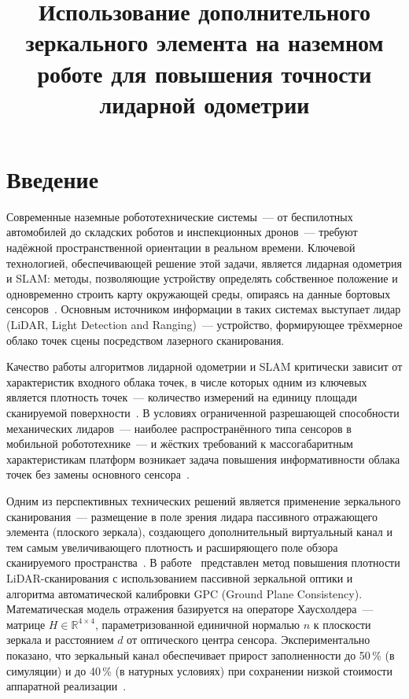 \documentclass{misisarticle}
\title{Использование дополнительного зеркального элемента на наземном роботе для повышения точности лидарной одометрии}
\begin{document}
\maketitle

\section{Введение}

Современные наземные робототехнические системы~--- от беспилотных автомобилей до складских роботов и инспекционных дронов~--- требуют надёжной пространственной ориентации в реальном времени. Ключевой технологией, обеспечивающей решение этой задачи, является лидарная одометрия и SLAM: методы, позволяющие устройству определять собственное положение и одновременно строить карту окружающей среды, опираясь на данные бортовых сенсоров~\cite{thrun2005,xu2021}. Основным источником информации в таких системах выступает лидар (LiDAR, Light Detection and Ranging)~--- устройство, формирующее трёхмерное облако точек сцены посредством лазерного сканирования.

Качество работы алгоритмов лидарной одометрии и SLAM критически зависит от характеристик входного облака точек, в числе которых одним из ключевых является плотность точек~--- количество измерений на единицу площади сканируемой поверхности~\cite{beraldin2010}. В условиях ограниченной разрешающей способности механических лидаров~--- наиболее распространённого типа сенсоров в мобильной робототехнике~--- и жёстких требований к массогабаритным характеристикам платформ возникает задача повышения информативности облака точек без замены основного сенсора~\cite{wang2020,yoo2018}.

Одним из перспективных технических решений является применение зеркального сканирования~--- размещение в поле зрения лидара пассивного отражающего элемента (плоского зеркала), создающего дополнительный виртуальный канал и тем самым увеличивающего плотность и расширяющего поле обзора сканируемого пространства~\cite{vishnevsky2026}. В работе~\cite{vishnevsky2026} представлен метод повышения плотности LiDAR-сканирования с использованием пассивной зеркальной оптики и алгоритма автоматической калибровки GPC (Ground Plane Consistency). Математическая модель отражения базируется на операторе Хаусхолдера~--- матрице $H \in \mathbb{R}^{4\times4}$, параметризованной единичной нормалью $n$ к плоскости зеркала и расстоянием $d$ от оптического центра сенсора. Экспериментально показано, что зеркальный канал обеспечивает прирост заполненности до 50\,\% (в симуляции) и до 40\,\% (в натурных условиях) при сохранении низкой стоимости аппаратной реализации~\cite{vishnevsky2026,lidar3d2025}.
\end{document}
